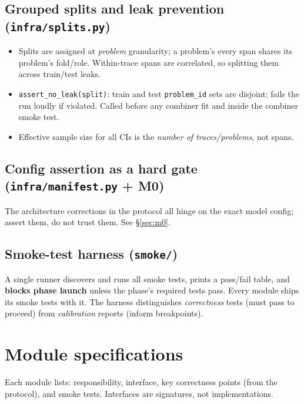 \documentclass[11pt]{article}
\begin{document}
\subsection{Grouped splits and leak prevention (\texttt{infra/splits.py})}
\begin{itemize}
\item Splits are assigned at \emph{problem} granularity; a problem's every span shares its problem's
fold/role. Within-trace spans are correlated, so splitting them across train/test leaks.
\item \texttt{assert\_no\_leak(split)}: train and test \texttt{problem\_id} sets are disjoint; fails the
run loudly if violated. Called before any combiner fit and inside the combiner smoke test.
\item Effective sample size for all CIs is the \emph{number of traces/problems}, not spans.
\end{itemize}

\subsection{Config assertion as a hard gate (\texttt{infra/manifest.py} + M0)}
The architecture corrections in the protocol all hinge on the exact model config; assert them, do not
trust them. See \S\ref{sec:m0}.

\subsection{Smoke-test harness (\texttt{smoke/})}
A single runner discovers and runs all smoke tests, prints a pass/fail table, and \textbf{blocks phase
launch} unless the phase's required tests pass. Every module ships its smoke tests with it. The harness
distinguishes \emph{correctness} tests (must pass to proceed) from \emph{calibration} reports (inform
breakpoints).

\section{Module specifications}
\label{sec:modules}
Each module lists: responsibility, interface, key correctness points (from the protocol), and smoke
tests. Interfaces are signatures, not implementations.
\end{document}
